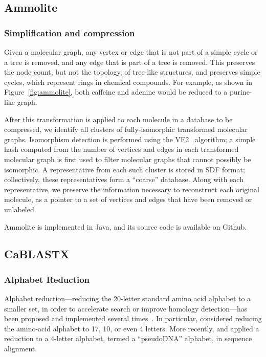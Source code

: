 \documentclass[review,preprint,12pt]{elsarticle}
\renewcommand{\cite}{\citep} %
\theoremstyle{definition}
\theoremstyle{remark}
\begin{document}
\subsection{Ammolite}

\subsubsection{Simplification and compression}

Given a molecular graph, any vertex or edge that is not part of a simple cycle or a tree is removed, and any edge that is part
of a tree is removed.
This preserves the node count, but not the topology, of tree-like structures, and preserves simple cycles,
which represent rings in chemical compounds.
For example, as shown in Figure~\ref{fig:ammolite}, both caffeine and adenine would be reduced to a purine-like graph.

After this transformation is applied to each molecule in a database to be compressed, we identify all clusters
of fully-isomorphic transformed molecular graphs.
Isomorphism detection is performed using the VF2~\cite{cordella2001improved} 
algorithm; a simple hash computed from the
number of vertices and edges in each transformed molecular graph is first used 
to filter molecular graphs that cannot possibly be isomorphic.
A representative from each such cluster is stored in SDF format; collectively, these representatives form a 
``coarse'' database.
Along with each representative, we preserve the information necessary to reconstruct each original molecule,
as a pointer to a set of vertices and edges that have been removed or unlabeled.

Ammolite is implemented in Java, and its source code is available on Github.

\subsection{CaBLASTX}

\subsubsection{Alphabet Reduction}

Alphabet reduction---reducing the 20-letter standard amino acid alphabet to a
smaller set, in order to accelerate search or improve homology detection---has
been proposed and implemented several times~\cite{bacardit2007automated, peterson2009reduced}.
In particular, \citet{murphy2000simplified} considered reducing the
amino-acid alphabet to 17, 10, or even 4 letters.
More recently, \citet{zhao2012rapsearch2} and \citet{huson2013poor} applied a reduction to
a 4-letter alphabet, termed a ``pseudoDNA'' alphabet, in sequence alignment.
\end{document}
